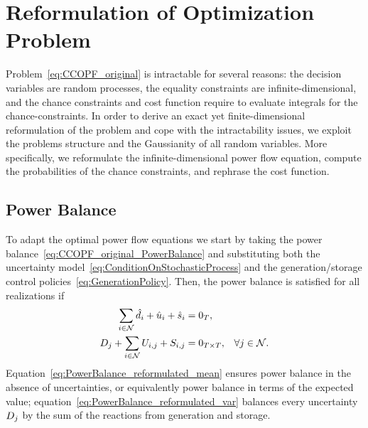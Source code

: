 \documentclass[final,3p,times,twocolumn]{elsarticle}  %
\begin{document}

\section{Reformulation of Optimization Problem}
\label{sec:SolutionMethodology}

Problem~\eqref{eq:CCOPF_original} is intractable for several reasons: the decision variables are random processes, the equality constraints are infinite-dimensional, and the chance constraints and cost function require to evaluate integrals for the chance-constraints. In order to derive an exact yet finite-dimensional reformulation of the problem and cope with the intractability issues, we exploit the problems structure and the Gaussianity of all random variables. More specifically, we reformulate the infinite-dimensional power flow equation, compute the probabilities of the chance constraints, and rephrase the cost function.

\subsection{Power Balance}
\label{sec:PowerBalance}

To adapt the optimal power flow equations we start by taking the power balance~\eqref{eq:CCOPF_original_PowerBalance} and substituting both the uncertainty model~\eqref{eq:ConditionOnStochasticProcess} and the generation/storage control policies~\eqref{eq:GenerationPolicy}. Then, the power balance is satisfied for all realizations if \cite{Muehlpfordt18c}
\begin{subequations}
	\label{eq:PowerBalance_reformulated}
	\begin{align}
	\label{eq:PowerBalance_reformulated_mean}	
	\sum_{i \in \mathcal{\nbus}} \hat\load_i + \hat\gen_i + \hat\storage_i &= 0_{\horizon}, \\
	\label{eq:PowerBalance_reformulated_var}	
	\Load_j + \sum_{i \in \mathcal{\nbus}} \Gen_{i,j} + \Storage_{i,j} &= 0_{\horizon \times \horizon}, & \forall j \in \mathcal{\nbus}.
	\end{align}
\end{subequations}
Equation~\eqref{eq:PowerBalance_reformulated_mean} ensures power balance in the absence of uncertainties, or equivalently power balance in terms of the expected value; equation~\eqref{eq:PowerBalance_reformulated_var} balances every uncertainty~$\Load_j$ by the sum of the reactions from generation and storage.
\end{document}
